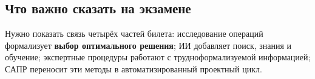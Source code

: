 \subsection{Что важно сказать на экзамене}

Нужно показать связь четырёх частей билета: исследование операций формализует \textbf{выбор оптимального решения}; ИИ добавляет поиск, знания и обучение; экспертные процедуры работают с трудноформализуемой информацией; САПР переносит эти методы в автоматизированный проектный цикл.

\newpage
